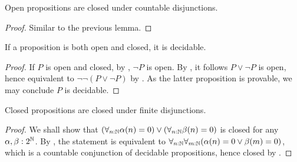 \begin{lemma}\label{OpenCountableDisjunction}
  Open propositions are closed under countable disjunctions. 
\end{lemma}
\begin{proof}
  Similar to the previous lemma. 
\end{proof}

\begin{corollary}\label{ClopenDecidable}
  If a proposition is both open and closed, it is decidable. 
\end{corollary}
\begin{proof}
  If $P$ is open and closed, by , $\neg P$ is open.
  By , it follows $P\vee \neg P$ is open, 
  hence 
  equivalent to $\neg \neg (P \vee \neg P)$ by .
  As the latter proposition is provable, we may conclude $P$ is decidable. 
%  
\end{proof}

\begin{lemma}\label{ClosedFiniteDisjunction} 
  Closed propositions are closed under finite disjunctions. 
\end{lemma}
\begin{proof}
  We shall show that 
  $(\forall_{n:\mathbb{N}} \alpha(n) = 0 )\vee (\forall_{n:\mathbb{N}} \beta(n) = 0 )$ is closed for any $\alpha,\beta:2^{\mathbb{N}}$.
  By , the statement is equivalent to 
  $ \forall_{n:\mathbb{N}}  \forall_{m:\mathbb{N}}  (\alpha(n) = 0 \vee \beta(m) = 0)$, 
  which is a countable conjunction of decidable propositions, 
  hence closed by .
\end{proof}

